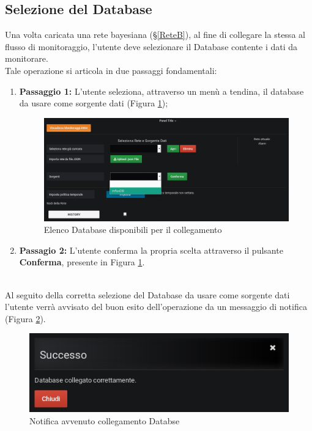 \subsection{Selezione del Database}\label{SelectDB}

Una volta caricata una rete bayesiana (§\ref{ReteB}), al fine di collegare la stessa al flusso di monitoraggio, l'utente deve selezionare il Database contente i dati da monitorare.\\
Tale operazione si articola in due passaggi fondamentali:
\begin{enumerate}
	\item \textbf{Passaggio 1:} L'utente seleziona, attraverso un menù a tendina, il database da usare come sorgente dati (Figura \ref{Sorgenti});
	\begin{figure}[H]
	\begin{center}
		\includegraphics[scale=0.35]{./images/Sorgenti.png}
		 \caption{Elenco Database disponibili per il collegamento}	
		 \label{Sorgenti}
	\end{center}
	\end{figure}
	\item \textbf{Passagio 2:} L'utente conferma la propria scelta attraverso il pulsante \textbf{Conferma}, presente in Figura \ref{Sorgenti}.
\end{enumerate}
~\\
Al seguito della corretta selezione del Database da usare come sorgente dati l'utente verrà avvisato del buon esito dell'operazione da un messaggio di notifica (Figura \ref{NotificaSorgente}). 

\begin{figure}[H]
	\begin{center}
		\includegraphics[scale=0.6]{./images/NotificaSorgente.png}
		 \caption{Notifica avvenuto collegamento Databse}	
		 \label{NotificaSorgente}
	\end{center}
\end{figure}